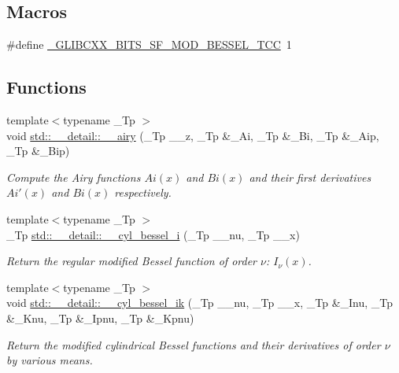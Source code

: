 \subsection*{Macros}
\begin{DoxyCompactItemize}
\item 
\#define \hyperlink{sf__mod__bessel_8tcc_a746f247a80ce9ef275dfb1cffbabeabd}{\+\_\+\+G\+L\+I\+B\+C\+X\+X\+\_\+\+B\+I\+T\+S\+\_\+\+S\+F\+\_\+\+M\+O\+D\+\_\+\+B\+E\+S\+S\+E\+L\+\_\+\+T\+CC}~1
\end{DoxyCompactItemize}
\subsection*{Functions}
\begin{DoxyCompactItemize}
\item 
{\footnotesize template$<$typename \+\_\+\+Tp $>$ }\\void \hyperlink{namespacestd_1_1____detail_aaf4b5556c6d01bad1892cb1515b22c64}{std\+::\+\_\+\+\_\+detail\+::\+\_\+\+\_\+airy} (\+\_\+\+Tp \+\_\+\+\_\+z, \+\_\+\+Tp \&\+\_\+\+Ai, \+\_\+\+Tp \&\+\_\+\+Bi, \+\_\+\+Tp \&\+\_\+\+Aip, \+\_\+\+Tp \&\+\_\+\+Bip)
\begin{DoxyCompactList}\small\item\em Compute the Airy functions $ Ai(x) $ and $ Bi(x) $ and their first derivatives $ Ai'(x) $ and $ Bi(x) $ respectively. \end{DoxyCompactList}\item 
{\footnotesize template$<$typename \+\_\+\+Tp $>$ }\\\+\_\+\+Tp \hyperlink{namespacestd_1_1____detail_a72e3392d5c03c0bc8f2b5ffb8c1304b5}{std\+::\+\_\+\+\_\+detail\+::\+\_\+\+\_\+cyl\+\_\+bessel\+\_\+i} (\+\_\+\+Tp \+\_\+\+\_\+nu, \+\_\+\+Tp \+\_\+\+\_\+x)
\begin{DoxyCompactList}\small\item\em Return the regular modified Bessel function of order $ \nu $\+: $ I_{\nu}(x) $. \end{DoxyCompactList}\item 
{\footnotesize template$<$typename \+\_\+\+Tp $>$ }\\void \hyperlink{namespacestd_1_1____detail_af699e7a6d31556df09f0a0db4f196cc0}{std\+::\+\_\+\+\_\+detail\+::\+\_\+\+\_\+cyl\+\_\+bessel\+\_\+ik} (\+\_\+\+Tp \+\_\+\+\_\+nu, \+\_\+\+Tp \+\_\+\+\_\+x, \+\_\+\+Tp \&\+\_\+\+Inu, \+\_\+\+Tp \&\+\_\+\+Knu, \+\_\+\+Tp \&\+\_\+\+Ipnu, \+\_\+\+Tp \&\+\_\+\+Kpnu)
\begin{DoxyCompactList}\small\item\em Return the modified cylindrical Bessel functions and their derivatives of order $ \nu $ by various means. \end{DoxyCompactList}\item 

\end{DoxyCompactItemize}
